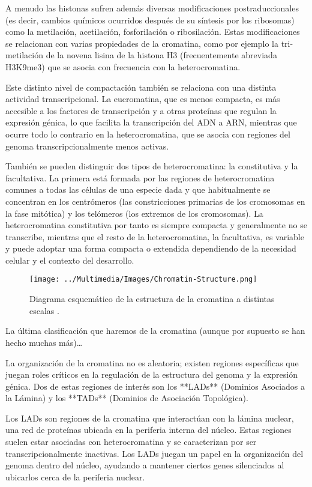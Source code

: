 A menudo las histonas sufren además diversas modificaciones postraduccionales (es decir, cambios químicos ocurridos después de su síntesis por los ribosomas) como la metilación, acetilación, fosforilación o ribosilación. Estas modificaciones se relacionan con varias propiedades de la cromatina, como por ejemplo la tri-metilación de la novena lisina de la histona H3 (frecuentemente abreviada H3K9me3) que se asocia con frecuencia con la heterocromatina.

Este distinto nivel de compactación también se relaciona con una distinta actividad transcripcional. La eucromatina, que es menos compacta, es más accesible a los factores de transcripción y a otras proteínas que regulan la expresión génica, lo que facilita la transcripción del ADN a ARN, mientras que ocurre todo lo contrario en la heterocromatina, que se asocia con regiones del genoma transcripcionalmente menos activas.

También se pueden distinguir dos tipos de heterocromatina: la constitutiva y la facultativa. La primera está formada por las regiones de heterocromatina comunes a todas las células de una especie dada y que habitualmente se concentran en los centrómeros (las constricciones primarias de los cromosomas en la fase mitótica) y los telómeros (los extremos de los cromosomas). La heterocromatina constitutiva por tanto es siempre compacta y generalmente no se transcribe, mientras que el resto de la heterocromatina, la facultativa, es variable y puede adoptar una forma compacta o extendida dependiendo de la necesidad celular y el contexto del desarrollo.

\begin{figure}
    \centering
    \texttt{[image: ../Multimedia/Images/Chromatin-Structure.png]}
    \caption{Diagrama esquemático de la estructura de la cromatina a distintas escalas \cite{Misteli2020}.}
    \label{fig:chromatin-structure}
\end{figure}

La última clasificación que haremos de la cromatina (aunque por supuesto se han hecho muchas más)\dots

La organización de la cromatina no es aleatoria; existen regiones específicas que juegan roles críticos en la regulación de la estructura del genoma y la expresión génica. Dos de estas regiones de interés son los **LADs** (Dominios Asociados a la Lámina) y los **TADs** (Dominios de Asociación Topológica).

Los LADs son regiones de la cromatina que interactúan con la lámina nuclear, una red de proteínas ubicada en la periferia interna del núcleo. Estas regiones suelen estar asociadas con heterocromatina y se caracterizan por ser transcripcionalmente inactivas. Los LADs juegan un papel en la organización del genoma dentro del núcleo, ayudando a mantener ciertos genes silenciados al ubicarlos cerca de la periferia nuclear.

